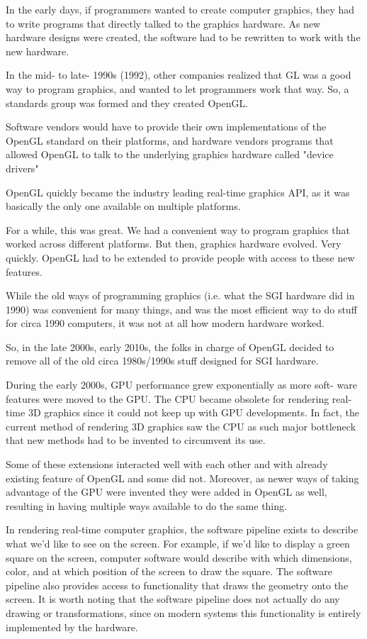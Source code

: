 In the early days, if programmers wanted to create computer graphics, they had to
write programs that directly talked to the graphics hardware.
As new hardware designs were created, the software had to be rewritten to
work with the new hardware.

In the mid- to late- 1990s (1992), other companies realized that GL was a good
way to program graphics, and wanted to let programmers work that way. So, a
standards group was formed and they created OpenGL.

Software vendors would have to provide their own implementations of the
OpenGL standard on their platforms, and hardware vendors programs that
allowed OpenGL to talk to the underlying graphics hardware called "device
drivers"

OpenGL quickly became the industry leading real-time graphics API, as it
was basically the only one available on multiple platforms.

For a while, this was great. We had a convenient way to program graphics
that worked across different platforms. But then, graphics hardware evolved.
Very quickly. OpenGL had to be extended to provide people with access to
these new features.

While the old ways of programming graphics (i.e. what the SGI
hardware did in 1990) was convenient for many things, and was the most efficient
way to do stuff for circa 1990 computers, it was not at all how modern hardware
worked.

So, in the late 2000s, early 2010s, the folks in charge of OpenGL decided to
remove all of the old circa 1980s/1990s stuff designed for SGI hardware.

During the early 2000s, GPU performance grew exponentially as more soft-
ware features were moved to the GPU. The CPU became obsolete for rendering
real-time 3D graphics since it could not keep up with GPU developments. In
fact, the current method of rendering 3D graphics saw the CPU as such major
bottleneck that new methods had to be invented to circumvent its use.

Some of these extensions interacted well with each other and
with already existing feature of OpenGL and
some did not. Moreover, as newer ways of taking advantage of the GPU were
invented they were added in OpenGL as well, resulting in having multiple ways
available to do the same thing.

In rendering real-time computer graphics, the software pipeline exists to
describe what we'd like to see on the screen. For example, if we'd like to display
a green square on the screen, computer software would describe with which
dimensions, color, and at which position of the screen to draw the square.
The software pipeline also provides access to functionality that draws the
geometry onto the screen. It is worth noting that the software pipeline does
not actually do any drawing or transformations, since on modern systems this
functionality is entirely implemented by the hardware.

